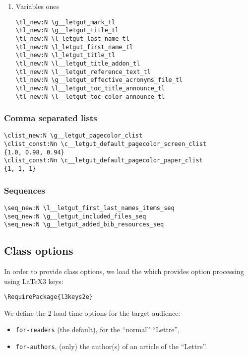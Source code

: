 \documentclass{letgut}
\begin{document}
\begin{enumerate}
\item Variables ones
\label{ImplementationDeclarationsTokenlistsVariablesones-pxcg55h0jlj0}
\begin{lstlisting}
\tl_new:N \g__letgut_mark_tl
\tl_new:N \g__letgut_title_tl
\tl_new:N \l_letgut_last_name_tl
\tl_new:N \l_letgut_first_name_tl
\tl_new:N \l_letgut_title_tl
\tl_new:N \l__letgut_title_addon_tl
\tl_new:N \l__letgut_reference_text_tl
\tl_new:N \g__letgut_effective_acronyms_file_tl
\tl_new:N \l__letgut_toc_title_announce_tl
\tl_new:N \l__letgut_toc_color_announce_tl
\end{lstlisting}
\end{enumerate}

\subsubsection{Comma separated lists}
\label{ImplementationDeclarationsCommaseparatedlists-vhdg55h0jlj0}
\begin{lstlisting}
\clist_new:N \g__letgut_pagecolor_clist
\clist_const:Nn \c__letgut_default_pagecolor_screen_clist
{1.0, 0.98, 0.94}
\clist_const:Nn \c__letgut_default_pagecolor_paper_clist
{1, 1, 1}
\end{lstlisting}

\subsubsection{Sequences}
\label{ImplementationDeclarationsSequences-m2eg55h0jlj0}
\begin{lstlisting}
\seq_new:N \l__letgut_first_last_names_items_seq
\seq_new:N \g__letgut_included_files_seq
\seq_new:N \g__letgut_added_bib_resources_seq
\end{lstlisting}

\subsection{Class options}
\label{ImplementationClassoptions-4meg55h0jlj0}
In order to provide class options, we load the  which provides
\LaTeXe{} option processing using \LaTeX3 keys:

\begin{lstlisting}
\RequirePackage{l3keys2e}
\end{lstlisting}

We define the 2 load time options for the target audience:

\begin{itemize}
\item \lstinline+for-readers+ (the default), for the “normal” “Lettre”,
\item \lstinline+for-authors+, (only) the author(s) of an article of the “Lettre”.
\end{itemize}
\end{document}
